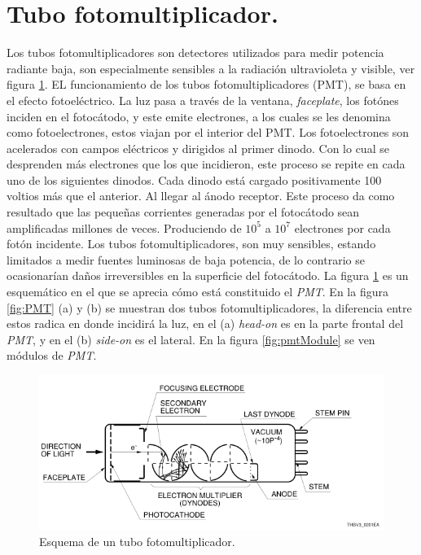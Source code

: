 \section{Tubo fotomultiplicador.}
Los tubos fotomultiplicadores son detectores utilizados para medir potencia radiante baja, son especialmente sensibles a la radiación ultravioleta y visible, ver figura \ref{fig:pmte}. EL funcionamiento de los tubos fotomultiplicadores (PMT), se basa en el efecto fotoeléctrico.  
La luz pasa a través de la ventana, \textit{faceplate}, los fotónes inciden en el fotocátodo, y este emite electrones, a los cuales se les denomina como fotoelectrones, estos viajan por el interior del PMT.  Los fotoelectrones son acelerados con campos eléctricos y dirigidos al primer dinodo. Con lo cual se desprenden más electrones que los que incidieron, este proceso se repite en cada uno de los siguientes dinodos. Cada dinodo está cargado positivamente 100 voltios más que el anterior. Al llegar al ánodo receptor. Este proceso da como resultado que las pequeñas corrientes generadas por el fotocátodo sean amplificadas millones de veces. Produciendo de $10^5$ a $10^7$ electrones por cada fotón incidente.
Los tubos fotomultiplicadores, son muy sensibles, estando limitados a medir fuentes luminosas de baja potencia, de lo contrario se ocasionarían daños irreversibles en la superficie del fotocátodo.
La figura \ref{fig:pmte} es un esquemático en el que se aprecia cómo está constituido el \textit{PMT}. En la figura \ref{fig:PMT} (a) y (b) se muestran dos tubos fotomultiplicadores, la diferencia entre estos radica en donde incidirá la luz, en el (a) \textit{head-on} es en la parte frontal del \textit{PMT}, y en el (b) \textit{side-on} es el lateral. En la figura \ref{fig:pmtModule} se ven módulos de \textit{PMT}. 
 
 \begin{figure}
	\centering
	\includegraphics[width=0.9\linewidth]{Imagenes/2/PMT}
	\caption[Esquema de un tubo fotomultiplicador.]{Esquema de un tubo fotomultiplicador.\cite{Hamamatsu2006}}
	\label{fig:pmte}
\end{figure}

